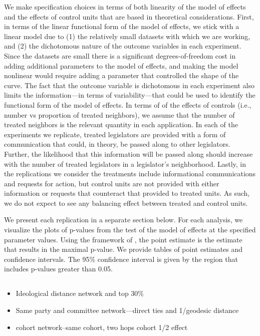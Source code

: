 \documentclass[12pt]{article}
\begin{document}
We make specification choices in terms of both linearity of the model of effects and the effects of control units that are based in theoretical considerations. First, in terms of the linear functional form of the model of effects, we stick with a linear model due to (1) the relatively small datasets with which we are working, and (2) the dichotomous nature of the outcome variables in each experiment. Since the datasets are small there is a significant degrees-of-freedom cost in adding additional parameters to the model of effects, and making the model nonlinear would require adding a parameter that controlled the shape of the curve. The fact that the outcome variable is dichotomous in each experiment also limits the information---in terms of variability---that could be used to identify the functional form of the model of effects. In terms of of the effects of controls (i.e., number vs proportion of treated neighbors), we assume that the number of treated neighbors is the relevant quantity in each application.  In each of the experiments we replicate, treated legislators are provided with a form of communication that could, in theory, be passed along to other legislators. Further, the likelihood that this information will be passed along should increase with the number of treated legislators in a legislator's neighborhood. Lastly, in the replications we consider the treatments include informational communications and requests for action, but control units are not provided with either information or requests that counteract that provided to treated units. As such, we do not expect to see any balancing effect between treated and control units.

We present each replication in a separate section below. For each analysis, we visualize the plots of p-values from the test of the model of effects at the specified parameter values. Using the framework of \citet{bowers2012reasoning}, the point estimate is the estimate that results in the maximal p-value. We provide tables of point estimates and confidence intervals. The 95\% confidence interval is given by the region that includes p-values greater than 0.05.

\subsection{\citet{butler2011can}}

\begin{itemize}
\item Ideological distance network and top 30\% 
\item Same party and committee network---direct ties and 1/geodesic distance
\item cohort network--same cohort, two hops cohort 1/2 effect
\end{itemize}
\end{document}
